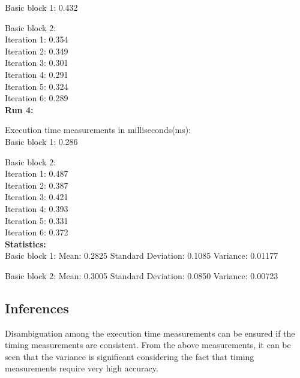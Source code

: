 Basic block 1: 0.432

Basic block 2:\\
\hspace{2em} Iteration 1: 0.354\\
\hspace{2em} Iteration 2: 0.349\\
\hspace{2em} Iteration 3: 0.301\\
\hspace{2em} Iteration 4: 0.291\\
\hspace{2em} Iteration 5: 0.324\\
\hspace{2em} Iteration 6: 0.289\\

\textbf{Run 4:}

Execution time measurements in milliseconds(ms):\\

Basic block 1: 0.286

Basic block 2:\\
\hspace{2em} Iteration 1: 0.487\\
\hspace{2em} Iteration 2: 0.387\\
\hspace{2em} Iteration 3: 0.421\\
\hspace{2em} Iteration 4: 0.393\\
\hspace{2em} Iteration 5: 0.331\\
\hspace{2em} Iteration 6: 0.372\\

\textbf{Statistics: }\\

Basic block 1:
\hspace{2em} Mean: 0.2825
\hspace{2em} Standard Deviation: 0.1085
\hspace{2em} Variance: 0.01177

Basic block 2:
\hspace{2em} Mean: 0.3005
\hspace{2em} Standard Deviation: 0.0850
\hspace{2em} Variance: 0.00723


\subsection{Inferences}
Disambiguation among the execution time measurements can be ensured if the timing measurements are consistent. From the above measurements, it can be seen that the variance is significant considering the fact that timing measurements require very high accuracy.

